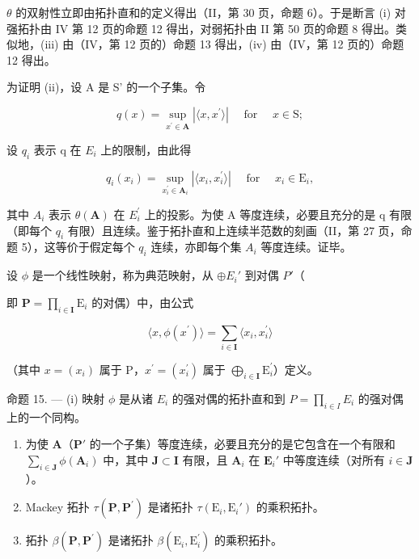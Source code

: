 \(\theta\) 的双射性立即由拓扑直和的定义得出（II，第 30 页，命题 6）。于是断言 (i) 对强拓扑由 IV 第 12 页的命题 12 得出，对弱拓扑由 II 第 50 页的命题 8 得出。类似地，(iii) 由（IV，第 12 页的）命题 13 得出，(iv) 由（IV，第 12 页的）命题 12 得出。

为证明 (ii)，设 A 是 S' 的一个子集。令

\[
q (x) = \sup _ {x ^ {\prime} \in \mathbf {A}} | \langle x, x ^ {\prime} \rangle | \quad \text { for } \quad x \in \mathrm{S};\tag{11}
\]

设 \(q_{i}\) 表示 q 在 \(E_{i}\) 上的限制，由此得

\[
q _ {i} (x _ {i}) = \sup _ {x _ {i} ^ {\prime} \in \mathbf {A} _ {i}} | \langle x _ {i}, x _ {i} ^ {\prime} \rangle | \quad \text { for } \quad x _ {i} \in \mathrm{E} _ {i},\tag{12}
\]

其中 \(A_{i}\) 表示 \(\theta(\mathbf{A})\) 在 \(E_{i}^{\prime}\) 上的投影。为使 A 等度连续，必要且充分的是 q 有限（即每个 \(q_{i}\) 有限）且连续。鉴于拓扑直和上连续半范数的刻画（II，第 27 页，命题 5），这等价于假定每个 \(q_{i}\) 连续，亦即每个集 \(A_{i}\) 等度连续。证毕。

设 \(\phi\) 是一个线性映射，称为典范映射，从 \(\oplus E_i'\) 到对偶 \(P'\)（

即 \(\mathbf{P} = \prod_{i\in \mathbf{I}}\mathrm{E}_i\) 的对偶）中，由公式

\[
\langle x, \phi (x ^ {\prime}) \rangle = \sum_ {i \in \mathbf {I}} \langle x _ {i}, x _ {i} ^ {\prime} \rangle\tag{13}
\]

（其中 \(x = (x_{i})\) 属于 \(\mathrm{P}\)，\(x^{\prime} = (x_{i}^{\prime})\) 属于 \(\bigoplus_{i\in \mathbf{I}}\mathrm{E}_{i}^{\prime}\)）定义。

命题 15. --- (i) 映射 \(\phi\) 是从诸 \(E_i\) 的强对偶的拓扑直和到 \(P = \prod_{i \in I} E_i\) 的强对偶上的一个同构。

\begin{enumerate}
\def\labelenumi{(\roman{enumi})}
\setcounter{enumi}{1}
\item
  为使 \(\mathbf{A}\)（\(\mathbf{P}'\) 的一个子集）等度连续，必要且充分的是它包含在一个有限和 \(\sum_{i\in \mathbf{J}}\phi (\mathbf{A}_i)\) 中，其中 \(\mathbf{J}\subset \mathbf{I}\) 有限，且 \(\mathbf{A}_i\) 在 \(\mathbf{E}_i'\) 中等度连续（对所有 \(i\in \mathbf{J}\)）。
\item
  Mackey 拓扑 \(\tau (\mathbf{P},\mathbf{P}^{\prime})\) 是诸拓扑 \(\tau (\mathrm{E}_i,\mathrm{E}_i')\) 的乘积拓扑。
\item
  拓扑 \(\beta (\mathbf{P},\mathbf{P}^{\prime})\) 是诸拓扑 \(\beta (\mathrm{E}_i,\mathrm{E}_i^{\prime})\) 的乘积拓扑。
\end{enumerate}

